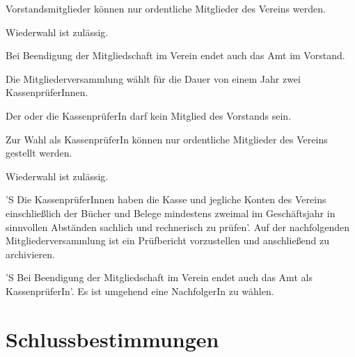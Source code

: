\documentclass[%
    parskip=half,
]{scrartcl}
\begin{document}
\begin{contract}
Vorstandsmitglieder können nur ordentliche Mitglieder des Vereins werden.

Wiederwahl ist zulässig.

Bei Beendigung der Mitgliedschaft im Verein endet auch das Amt im Vorstand.


Die Mitgliederversammlung wählt für die Dauer von einem Jahr zwei KassenprüferInnen.

Der oder die KassenprüferIn darf kein Mitglied des Vorstands sein.

Zur Wahl als KassenprüferIn können nur ordentliche Mitglieder des Vereins gestellt werden.

Wiederwahl ist zulässig.

'S Die KassenprüferInnen haben die Kasse und jegliche Konten des Vereins einschließlich der Bücher und Belege mindestens zweimal im Geschäftsjahr in sinnvollen Abständen sachlich und rechnerisch zu prüfen'.
Auf der nachfolgenden Mitgliederversammlung ist ein Prüfbericht vorzustellen und anschließend zu archivieren.

'S Bei Beendigung der Mitgliedschaft im Verein endet auch das Amt als KassenprüferIn'.
Es ist umgehend eine NachfolgerIn zu wählen.

\end{contract}

\section{Schlussbestimmungen}
\end{document}
